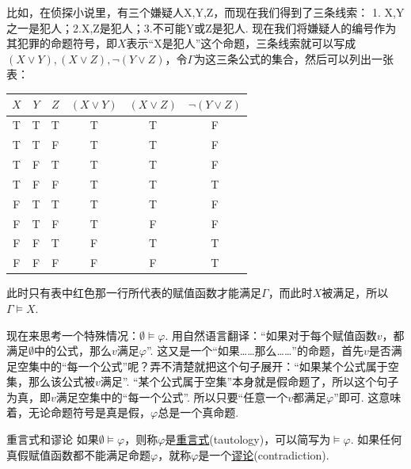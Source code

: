 \begin{note}
    比如，在侦探小说里，有三个嫌疑人X,Y,Z，而现在我们得到了三条线索：
    1. X,Y之一是犯人；2.X,Z是犯人；3.不可能Y或Z是犯人. 现在我们将嫌疑人的编号作为其犯罪的命题符号，即\(X\)表示“X是犯人”这个命题，三条线索就可以写成\((X \vee Y), (X \vee Z), \neg(Y \vee Z)\)，令\(\Gamma\)为这三条公式的集合，然后可以列出一张表：
    \begin{center}
        \begin{tabular}{ccc|ccc}
            \hline
            \(X\) & \(Y\) & \(Z\) & \((X \vee Y)\) & \((X \vee Z)\) & \(\neg(Y \vee Z)\) \\
            \hline
            T & T & T & T & T & F \\
            T & T & F & T & T & F \\
            T & F & T & T & T & F \\
            {\color{red}T} & {\color{red}F} & {\color{red}F} & {\color{red}T} & {\color{red}T} & {\color{red}T} \\
            F & T & T & T & T & F \\
            F & T & F & T & F & F \\
            F & F & T & F & T & T \\
            F & F & F & F & F & T \\
            \hline
        \end{tabular}
    \end{center}
    此时只有表中红色那一行所代表的赋值函数才能满足\(\Gamma\)，而此时\(X\)被满足，所以\(\Gamma \vDash X\). 
\end{note}

现在来思考一个特殊情况：\(\emptyset \vDash \varphi\). 用自然语言翻译：“如果对于每个赋值函数\(v\)，都满足\(\emptyset\)中的公式，那么\(v\)满足\(\varphi\)”. 这又是一个“如果……那么……”的命题，首先\(v\)是否满足空集中的“每一个公式”呢？弄不清楚就把这个句子展开：“如果某个公式属于空集，那么该公式被\(v\)满足”. “某个公式属于空集”本身就是假命题了，所以这个句子为真，即\(v\)满足空集中的“每一个公式”. 所以只要“任意一个\(v\)都满足\(\varphi\)”即可. 这意味着，无论命题符号是真是假，\(\varphi\)总是一个真命题.

\begin{definition}{重言式和谬论}
    如果\(\emptyset \vDash \varphi\)，则称\(\varphi\)是\underline{重言式}(tautology)，可以简写为\(\vDash \varphi\). \newline
    如果任何真假赋值函数都不能满足命题\(\varphi\)，就称\(\varphi\)是一个\underline{谬论}(contradiction).
\end{definition}

